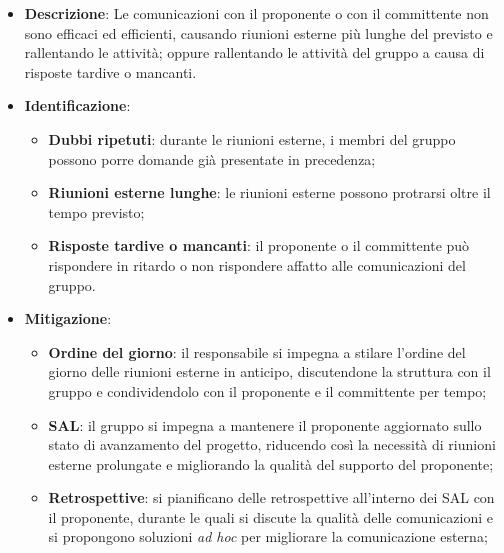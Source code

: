 \label{risk:comunicazione esterna carente}
\begin{itemize}
	\item \textbf{Descrizione}:
	      Le comunicazioni con il proponente o con il committente non sono
	      efficaci ed efficienti, causando riunioni esterne più lunghe del
	      previsto e rallentando le attività; oppure rallentando le attività
	      del gruppo a causa di risposte tardive o mancanti.

	\item \textbf{Identificazione}:
	      \begin{itemize}
		      \item \textbf{Dubbi ripetuti}: durante le riunioni esterne, i
		            membri del gruppo possono porre domande già presentate in
		            precedenza;

		      \item \textbf{Riunioni esterne lunghe}: le riunioni esterne
		            possono protrarsi oltre il tempo previsto;

		      \item \textbf{Risposte tardive o mancanti}: il proponente o il
		            committente può rispondere in ritardo o non rispondere
		            affatto alle comunicazioni del gruppo.
	      \end{itemize}

	\item \textbf{Mitigazione}:
	      \begin{itemize}
		      \item \textbf{Ordine del giorno}: il responsabile si impegna a
		            stilare l'ordine del giorno delle riunioni esterne in anticipo, 
					discutendone la struttura con il gruppo e condividendolo con il 
					proponente e il committente per tempo;

		      \item \textbf{SAL}: il gruppo si impegna a mantenere il
		            proponente aggiornato sullo stato di avanzamento del
		            progetto, riducendo così la necessità di riunioni esterne 
					prolungate e migliorando la qualità del supporto del proponente;

		      \item \textbf{Retrospettive}: si pianificano delle retrospettive all'interno 
			  		dei SAL con il proponente, durante le quali si discute la qualità 
					delle comunicazioni e si propongono soluzioni \textit{ad hoc} per migliorare 
					la comunicazione esterna;


\end{itemize}
\end{itemize}
